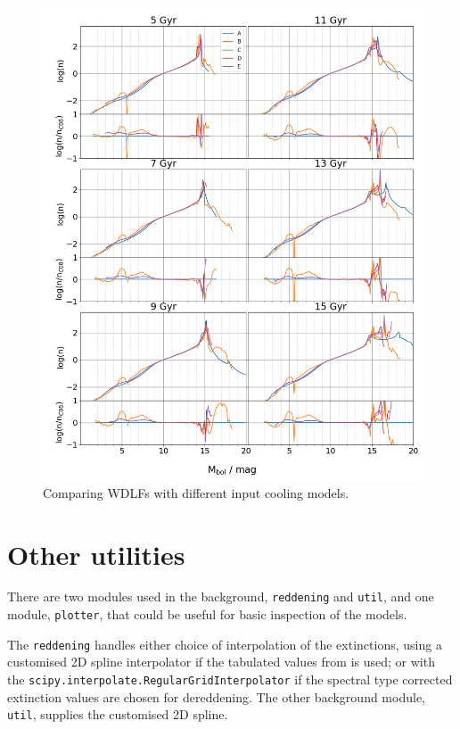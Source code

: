 \documentclass[fleqn,usenatbib]{rasti}
\begin{document}
\begin{figure}
    \centering
    \includegraphics[width=\textwidth]{wdlf_compare_da_cooling_models.png}
    \caption{Comparing WDLFs with different input cooling models.}
    \label{fig:wdlf_compare_da_cooling_models}
\end{figure}


\section{Other utilities}
There are two modules used in the background, \texttt{reddening} and
\texttt{util}, and one module, \texttt{plotter}, that could be useful for
basic inspection of the models.

The \texttt{reddening} handles either choice of interpolation of the
extinctions, using a customised 2D spline interpolator if the tabulated values
from \citet{2011ApJ...737..103S} is used; or with the
\verb+scipy.interpolate.RegularGridInterpolator+ if the spectral type corrected
extinction values are chosen for dereddening. The other background module,
\texttt{util}, supplies the customised 2D spline.
\end{document}
